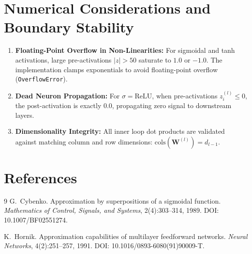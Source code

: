 \documentclass[11pt]{article}
\begin{document}
\section{Numerical Considerations and Boundary Stability}
\label{sec:numerical}

\begin{enumerate}
    \item \textbf{Floating-Point Overflow in Non-Linearities:} For sigmoidal and tanh activations, large pre-activations $|z| > 50$ saturate to $1.0$ or $-1.0$. The implementation clamps exponentials to avoid floating-point overflow (\texttt{OverflowError}).
    \item \textbf{Dead Neuron Propagation:} For $\sigma = \text{ReLU}$, when pre-activations $z_i^{(l)} \le 0$, the post-activation is exactly $0.0$, propagating zero signal to downstream layers.
    \item \textbf{Dimensionality Integrity:} All inner loop dot products are validated against matching column and row dimensions: $\text{cols}(\mathbf{W}^{(l)}) = d_{l-1}$.
\end{enumerate}

\section{References}
\label{sec:references}

\begin{thebibliography}{9}
G.~Cybenko.
\newblock Approximation by superpositions of a sigmoidal function.
\newblock \emph{Mathematics of Control, Signals, and Systems}, 2(4):303--314, 1989.
\newblock DOI: 10.1007/BF02551274.

K.~Hornik.
\newblock Approximation capabilities of multilayer feedforward networks.
\newblock \emph{Neural Networks}, 4(2):251--257, 1991.
\newblock DOI: 10.1016/0893-6080(91)90009-T.
\end{thebibliography}
\end{document}
